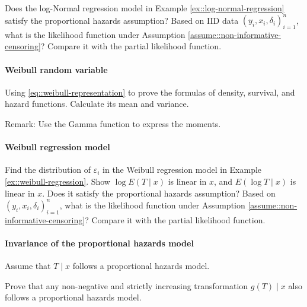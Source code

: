 Does the log-Normal regression model in Example \ref{ex::log-normal-regression} satisfy the proportional hazards assumption?
Based on IID data $(y_{i},x_{i},\delta_{i})_{i=1}^{n}$, what is the likelihood function under Assumption \ref{assume::non-informative-censoring}? 
Compare it with the partial likelihood function. 


\paragraph{Weibull random variable}
\label{hw23::weibull-rv}

Using \eqref{eq::weibull-representation} to prove the formulas of density, survival, and hazard functions. Calculate its mean and variance. 

Remark: Use the Gamma function to express the moments.


\paragraph{Weibull regression model}
\label{hw23::weibull-regression}


Find the distribution of $\varepsilon_i$ in the Weibull regression model in Example \ref{ex::weibull-regression}.  Show $\log E(T \mid x )$ is linear in $x$, and $E(\log T \mid x)$ is linear in $x$. Does it satisfy the proportional hazards assumption? Based on
$(y_{i},x_{i},\delta_{i})_{i=1}^{n}$, what is the likelihood function under Assumption \ref{assume::non-informative-censoring}? 
Compare it with the partial likelihood function. 




\paragraph{Invariance of the proportional hazards model}\label{hw23::invariance-ph-model}

Assume that $T \mid x$ follows a proportional hazards model. 

Prove that any non-negative and strictly increasing transformation $g(T)\mid x$ also follows a proportional
hazards model. 


 
 
